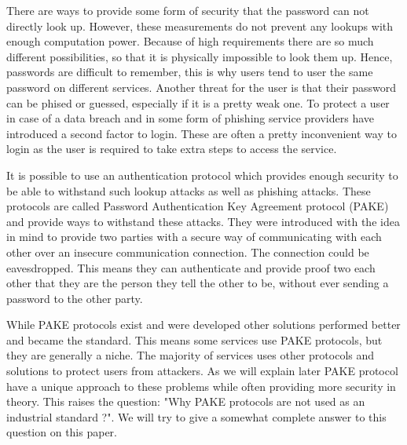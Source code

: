 \documentclass[journal]{IEEEtran}
\begin{document}
There are ways to provide some form of security that the password can not directly look up. However, these measurements do not prevent any lookups with enough computation power.
Because of  high requirements there are so much different possibilities, so that it is physically impossible to look them up.
Hence, passwords are difficult to remember, this is why users tend to user the same password on different services.
Another threat for the user is that their password can be phised  or guessed, especially if it is a pretty weak one. %
To protect a user in case of a data breach and in some form of phishing service providers have introduced a second factor to login. These are often a pretty inconvenient way to login as the user is required to take extra steps to access the service.

It is possible to use an authentication protocol which provides enough security to be able to withstand such lookup attacks as well as phishing attacks.
These protocols are called Password Authentication Key Agreement protocol (PAKE) and provide ways to withstand these attacks.
They were introduced with the idea in mind to provide two parties with a secure way of communicating with each other over an insecure communication connection. 
The connection could be eavesdropped.
This means they can authenticate and provide proof two each other that they are the person they tell the other to be, without ever sending a password to the other party.

While PAKE protocols exist and were developed other solutions performed better and became the standard.
This means some services use PAKE protocols, but they are generally a niche. 
The majority of services uses other protocols and solutions to protect users from attackers.
As we will explain later PAKE protocol have a unique approach to these problems while often providing more security in theory.
This raises the question: "Why PAKE protocols are not used as an industrial standard ?".
We will try to give a somewhat complete answer to this question on this paper. 
\end{document}
